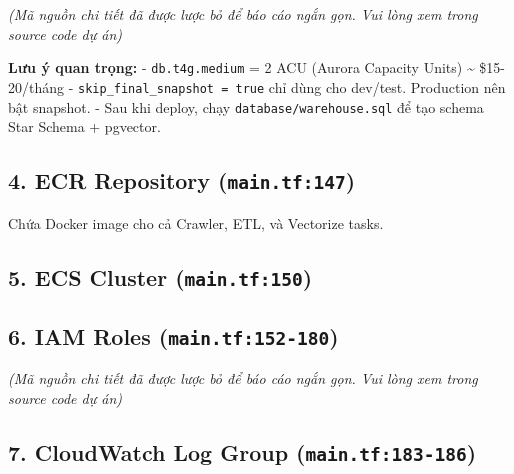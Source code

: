 \emph{(Mã nguồn chi tiết đã được lược bỏ để báo cáo ngắn gọn. Vui lòng
xem trong source code dự án)}

\textbf{Lưu ý quan trọng:} - \texttt{db.t4g.medium} = 2 ACU (Aurora
Capacity Units) \textasciitilde{} \$15-20/tháng -
\texttt{skip\_final\_snapshot\ =\ true} chỉ dùng cho dev/test.
Production nên bật snapshot. - Sau khi deploy, chạy
\texttt{database/warehouse.sql} để tạo schema Star Schema + pgvector.

\hypertarget{ecr-repository-main.tf147}{%
\subsection{\texorpdfstring{4. ECR Repository
(\texttt{main.tf:147})}{4. ECR Repository (main.tf:147)}}}

\begin{Shaded}
\begin{Highlighting}[]
\end{Highlighting}
\end{Shaded}

Chứa Docker image cho cả Crawler, ETL, và Vectorize tasks.

\hypertarget{ecs-cluster-main.tf150}{%
\subsection{\texorpdfstring{5. ECS Cluster
(\texttt{main.tf:150})}{5. ECS Cluster (main.tf:150)}}}

\begin{Shaded}
\begin{Highlighting}[]
\end{Highlighting}
\end{Shaded}

\hypertarget{iam-roles-main.tf152-180}{%
\subsection{\texorpdfstring{6. IAM Roles
(\texttt{main.tf:152-180})}{6. IAM Roles (main.tf:152-180)}}}

\emph{(Mã nguồn chi tiết đã được lược bỏ để báo cáo ngắn gọn. Vui lòng
xem trong source code dự án)}

\hypertarget{cloudwatch-log-group-main.tf183-186}{%
\subsection{\texorpdfstring{7. CloudWatch Log Group
(\texttt{main.tf:183-186})}{7. CloudWatch Log Group (main.tf:183-186)}}}


